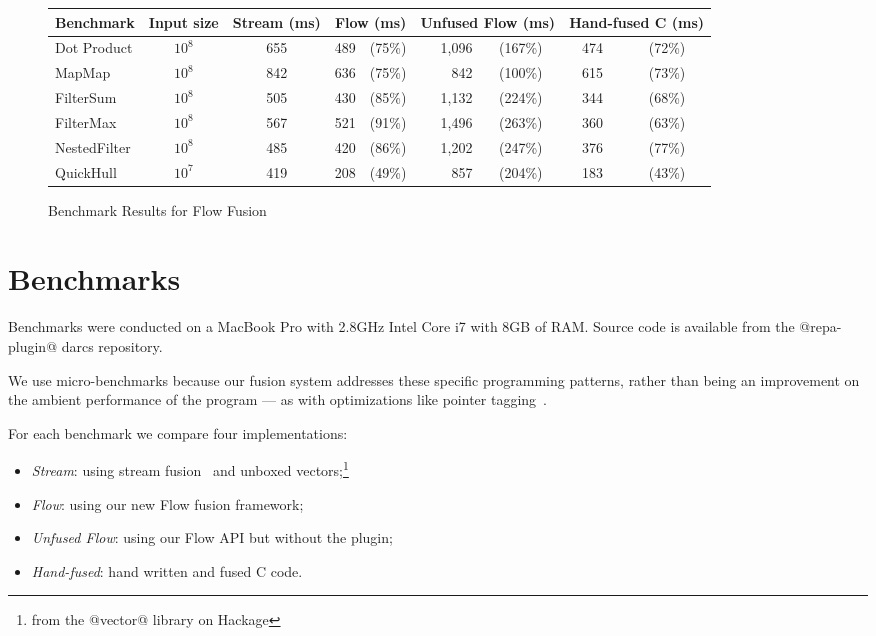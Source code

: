 

\begin{figure*}[t]
\begin{center}
\begin{tabular}{lccccrccc}
Benchmark 
        & Input size 
        & Stream (ms) 
        & \multicolumn{2}{c}{Flow (ms)} 
        & \multicolumn{2}{c}{Unfused Flow (ms)}  
        & \multicolumn{2}{c}{Hand-fused C (ms)}    \\
\hline
Dot Product &  $10^8$    & 655    & 489    &  (75\%) & 1,096  & (167\%)  & 474      & (72\%) \\
MapMap      &  $10^8$    & 842    & 636    &  (75\%) & 842    & (100\%)  & 615      & (73\%) \\
FilterSum   &  $10^8$    & 505    & 430    &  (85\%) & 1,132  & (224\%)  & 344      & (68\%) \\
FilterMax   &  $10^8$    & 567    & 521    &  (91\%) & 1,496  & (263\%)  & 360      & (63\%) \\
NestedFilter&  $10^8$    & 485    & 420    &  (86\%) & 1,202  & (247\%)  & 376      & (77\%) \\
QuickHull   &  $10^7$    & 419    & 208    &  (49\%) & 857    & (204\%)  & 183      & (43\%) \\
\end{tabular}
\caption{Benchmark Results for Flow Fusion}
\label{f:benchmark-table}
\end{center}
\end{figure*}


\section{Benchmarks}
\label{s:Benchmarks}
Benchmarks were conducted on a MacBook Pro with 2.8GHz Intel Core i7 with 8GB of RAM. Source code is available from the @repa-plugin@ darcs repository. 

We use micro-benchmarks because our fusion system addresses these specific programming patterns, rather than being an improvement on the ambient performance of the program --- as with optimizations like pointer tagging~\cite{Marlow:pointer-tagging}.

For each benchmark we compare four implementations:
\begin{itemize}
\item \emph{Stream}: using stream fusion~\cite{Coutts:stream-fusion} and unboxed vectors;\footnote{from the @vector@ library on Hackage}

\item \emph{Flow}: using our new Flow fusion framework;

\item \emph{Unfused Flow}: using our Flow API but without the plugin;

\item \emph{Hand-fused}: hand written and fused C code.
\end{itemize}

